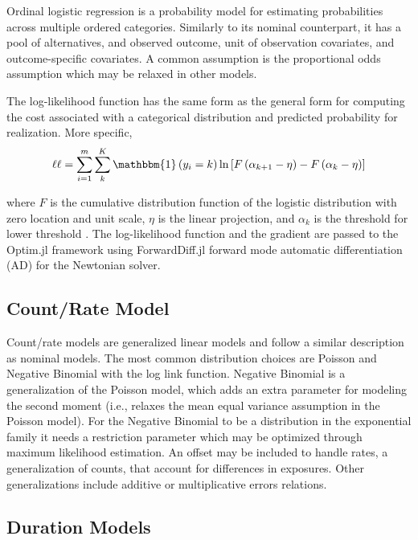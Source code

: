 \documentclass{juliacon}
\begin{document}
Ordinal logistic regression is a probability model for estimating probabilities across multiple ordered categories. Similarly to its nominal counterpart, it has a pool of alternatives, and observed outcome, unit of observation covariates, and outcome-specific covariates. A common assumption is the proportional odds assumption which may be relaxed in other models.

The log-likelihood function has the same form as the general form for computing the cost associated with a categorical distribution and predicted probability for realization. More specific,
\begin{equation}
	\ell \ell = \sum_{i = 1}^{m} \sum_{k}^{K} \mathbbm{1}\left(y_{i} = k\right) \ln\left[F\left(\alpha_{k + 1} - \eta\right) - F\left(\alpha_{k} - \eta\right)\right]
\end{equation}

where $F$ is the cumulative distribution function of the logistic distribution with zero location and unit scale, $\eta$ is the linear projection, and $\alpha_{k}$ is the threshold for lower threshold \cite{ologit}. The log-likelihood function and the gradient are passed to the Optim.jl framework \cite{Optim} using ForwardDiff.jl \cite{ForwardDiff} forward mode automatic differentiation (AD) for the Newtonian solver.

\subsection{Count/Rate Model}

Count/rate models are generalized linear models and follow a similar description as nominal models. The most common distribution choices are Poisson and Negative Binomial with the log link function. Negative Binomial is a generalization of the Poisson model, which adds an extra parameter for modeling the second moment (i.e., relaxes the mean equal variance assumption in the Poisson model). For the Negative Binomial to be a distribution in the exponential family it needs a restriction parameter which may be optimized through maximum likelihood estimation. An offset may be included to handle rates, a generalization of counts, that account for differences in exposures. Other generalizations include additive or multiplicative errors relations.

\subsection{Duration Models}
\end{document}
